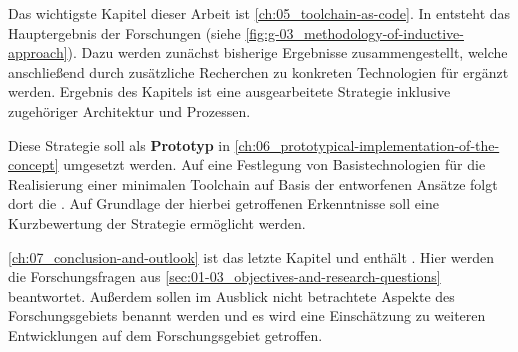 Das wichtigste Kapitel dieser Arbeit ist \autoref{ch:05_toolchain-as-code}. In  entsteht das Hauptergebnis der Forschungen (siehe \autoref{fig:g-03_methodology-of-inductive-approach}). Dazu werden zunächst bisherige Ergebnisse zusammengestellt, welche anschließend durch zusätzliche Recherchen zu konkreten Technologien für  ergänzt werden. Ergebnis des Kapitels ist eine ausgearbeitete  Strategie inklusive zugehöriger Architektur und Prozessen.

Diese Strategie soll als \textbf{Prototyp} in \autoref{ch:06_prototypical-implementation-of-the-concept} umgesetzt werden. Auf eine Festlegung von Basistechnologien für die Realisierung einer minimalen Toolchain auf Basis der entworfenen Ansätze folgt dort die . Auf Grundlage der hierbei getroffenen Erkenntnisse soll eine Kurzbewertung der  Strategie ermöglicht werden.

\autoref{ch:07_conclusion-and-outlook} ist das letzte Kapitel und enthält . Hier werden die Forschungsfragen aus \autoref{sec:01-03_objectives-and-research-questions} beantwortet. Außerdem sollen im Ausblick nicht betrachtete Aspekte des Forschungsgebiets benannt werden und es wird eine Einschätzung zu weiteren Entwicklungen auf dem Forschungsgebiet getroffen.
